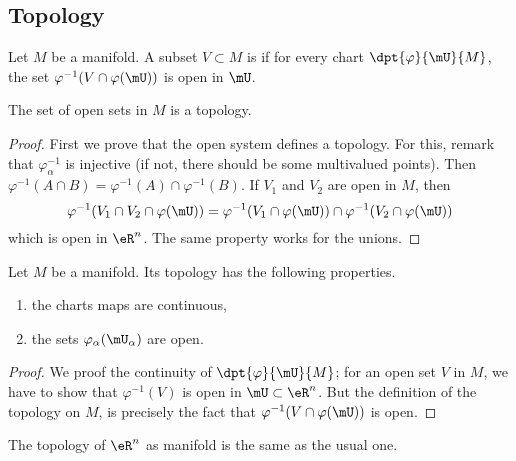 \subsection{Topology}

\begin{propositionDef}      \label{DEFooHGNOooNqGmxE}
    Let \( M\) be a manifold. A subset $V\subset M$ is  if for every chart $\dpt{\varphi}{\mU}{M}$, the set $\varphi^{-1}(V\cap\varphi(\mU))$ is open in $\mU$. 

    The set of open sets in \( M\) is a topology.
\end{propositionDef}

\begin{proof}
    First we prove that the open system defines a topology. For this, remark that $\varphi_{\alpha}^{-1}$ is injective (if not, there should be some multivalued points). Then $\varphi^{-1}(A\cap B)=\varphi^{-1}(A)\cap\varphi^{-1}(B)$. If $V_1$ and $V_2$ are open in $M$, then
    \begin{equation}
        \varphi^{-1}(V_1\cap V_2\cap\varphi(\mU))=\varphi^{-1}(V_1\cap\varphi(\mU))\cap\varphi^{-1}(V_2\cap\varphi(\mU))
    \end{equation}
    which is open in $\eR^n$. The same property works for the unions.
\end{proof}

\begin{theorem}     \label{THOooIAXUooDqMrav}
    Let \( M\) be a manifold. Its topology has the following properties.
    \begin{enumerate}
        \item the charts maps are continuous,
        \item the sets $\varphi_{\alpha}(\mU_{\alpha})$ are open.
    \end{enumerate}
\end{theorem}

\begin{proof}
    We proof the continuity of $\dpt{\varphi}{\mU}{M}$; for an open set $V$ in $M$, we have to show that $\varphi^{-1}(V)$ is open in $\mU\subset\eR^n$. But the definition of the topology on $M$, is precisely the fact that $\varphi^{-1}(V\cap\varphi(\mU))$ is open.
\end{proof}

\begin{lemma}       \label{LEMooGDMZooLCtnuA}
    The topology of \( \eR^n\) as manifold is the same as the usual one.
\end{lemma}

